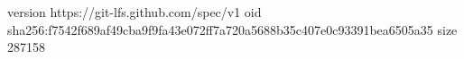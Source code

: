 version https://git-lfs.github.com/spec/v1
oid sha256:f7542f689af49cba9f9fa43e072ff7a720a5688b35c407e0c93391bea6505a35
size 287158
